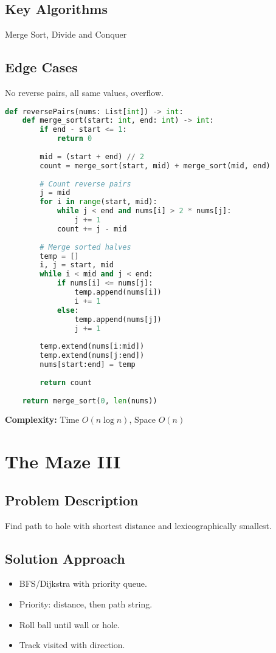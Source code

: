 \documentclass[10pt, a4paper]{article}
\begin{document}
\subsection*{Key Algorithms}
Merge Sort, Divide and Conquer

\subsection*{Edge Cases}
No reverse pairs, all same values, overflow.

\begin{lstlisting}[language=Python]
def reversePairs(nums: List[int]) -> int:
    def merge_sort(start: int, end: int) -> int:
        if end - start <= 1:
            return 0
        
        mid = (start + end) // 2
        count = merge_sort(start, mid) + merge_sort(mid, end)
        
        # Count reverse pairs
        j = mid
        for i in range(start, mid):
            while j < end and nums[i] > 2 * nums[j]:
                j += 1
            count += j - mid
        
        # Merge sorted halves
        temp = []
        i, j = start, mid
        while i < mid and j < end:
            if nums[i] <= nums[j]:
                temp.append(nums[i])
                i += 1
            else:
                temp.append(nums[j])
                j += 1
        
        temp.extend(nums[i:mid])
        temp.extend(nums[j:end])
        nums[start:end] = temp
        
        return count
    
    return merge_sort(0, len(nums))
\end{lstlisting}
\textbf{Complexity:} Time $O(n \log n)$, Space $O(n)$

\section{The Maze III}
\subsection*{Problem Description}
Find path to hole with shortest distance and lexicographically smallest.

\subsection*{Solution Approach}
\begin{itemize}
    \item BFS/Dijkstra with priority queue.
    \item Priority: distance, then path string.
    \item Roll ball until wall or hole.
    \item Track visited with direction.
\end{itemize}
\end{document}
